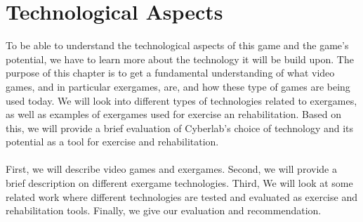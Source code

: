 \chapter{Technological Aspects}
To be able to understand the technological aspects of this game and the game's potential, we have to learn more about the technology it will be build upon.  The purpose of this chapter is to get a fundamental understanding of what video games, and in particular exergames, are, and how these type of games are being used today. We will look into different types of technologies related to exergames, as well as examples of exergames used for exercise an rehabilitation. Based on this, we will provide a brief evaluation of Cyberlab's choice of technology and its potential as a tool for exercise and rehabilitation.  \\ \\ 
First, we will describe video games and exergames. Second, we will provide a brief description on different exergame technologies. Third, We will look at some related work where different technologies are tested and evaluated as exercise and rehabilitation tools. Finally, we give our evaluation and recommendation.\\ \\

